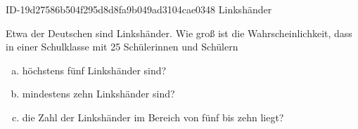 \begin{exercise}
      {ID-19d27586b504f295d8d8fa9b049ad3104cae0348}
      {Linkshänder}
  \ifproblem\problem\par
    Etwa  der Deutschen sind Linkshänder. Wie groß ist die
    Wahrscheinlichkeit, dass in einer Schulklasse mit 25 Schülerinnen und
    Schülern
    \begin{enumerate}[a)]
      \item höchstens fünf Linkshänder sind?
      \item mindestens zehn Linkshänder sind?
      \item die Zahl der Linkshänder im Bereich von fünf bis zehn liegt?
    \end{enumerate}
  \fi
\end{exercise}
